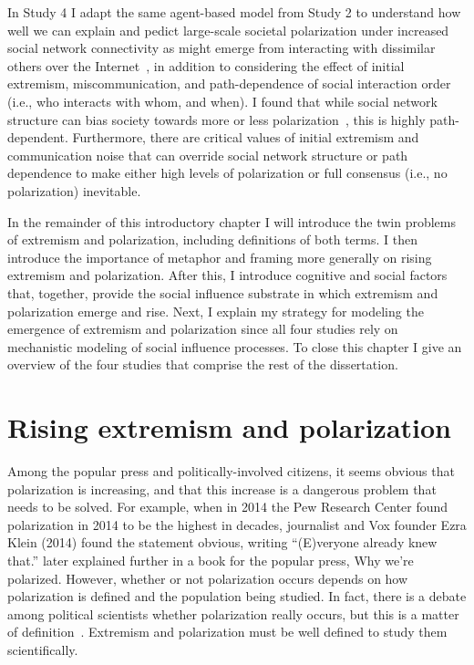 In Study 4 I adapt the same agent-based
model from Study 2 to understand how well we can explain and pedict large-scale
societal polarization under increased 
social network connectivity as might emerge from interacting with dissimilar
others over the Internet~\cite{Bail2018}, in addition to considering the effect
of initial extremism, miscommunication, and path-dependence of social interaction
order (i.e., who interacts with whom, and when). I found that while social network
structure can bias society towards more or less polarization~\cite{Flache2011}, 
this is highly path-dependent. Furthermore, there are critical values of initial extremism
and communication noise that can override social network structure or path 
dependence to make either high levels of polarization or full consensus 
(i.e., no polarization) inevitable.

In the remainder of this introductory chapter I will introduce the 
twin problems of extremism and polarization, including definitions of both
terms. I then introduce the importance of metaphor and framing more generally
on rising extremism and polarization. After this, I introduce cognitive and
social factors that, together, provide the social influence substrate in which extremism 
and polarization emerge and rise. Next, I explain my strategy for modeling the emergence of 
extremism and polarization since all four studies rely on mechanistic modeling
of social influence processes. To close this chapter I give an overview of the
four studies that comprise the rest of the dissertation.


\section{Rising extremism and polarization}

Among the popular press and politically-involved citizens, it seems obvious
that polarization is increasing, and that this increase is a 
dangerous problem that needs to be solved. 
For example, when in 2014 the Pew Research Center found polarization
in 2014 to be the highest in decades, journalist and Vox founder Ezra Klein 
(2014) found the statement obvious, writing ``(E)veryone already knew that.''
 later explained further in a book for the popular press,
{Why we're polarized}. 
However, whether or not polarization occurs depends on how polarization 
is defined and the population being studied. 
In fact, there is a debate among political scientists whether
polarization really occurs, but this is a matter of definition~\cite{Mason2015,Lelkes2016,Kinder2017}.
Extremism and polarization must be well defined to study them scientifically.

